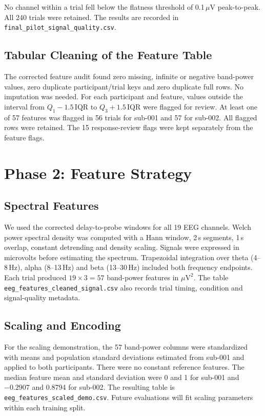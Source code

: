 \documentclass[11pt,a4paper]{article}
\begin{document}
No channel within a trial fell below the flatness threshold of
0.1\,$\mu$V peak-to-peak. All 240 trials were retained. The results
are recorded in \texttt{final\_pilot\_signal\_quality.csv}.

\subsection{Tabular Cleaning of the Feature Table}
The corrected feature audit found zero missing, infinite or negative band-power
values, zero duplicate participant/trial keys and zero duplicate full rows.
No imputation was needed. For each participant and feature, values outside
the interval from $Q_1-1.5\,\mathrm{IQR}$ to $Q_3+1.5\,\mathrm{IQR}$ were flagged
for review. At least one of 57 features was flagged in 56 trials for sub-001
and 57 for sub-002. All flagged rows were retained. The 15 response-review
flags were kept separately from the feature flags.

\section{Phase 2: Feature Strategy}

\subsection{Spectral Features}
We used the corrected delay-to-probe windows for all 19 EEG channels.
Welch power spectral density \cite{welch1967} was computed with a Hann window,
2\,s segments, 1\,s overlap, constant detrending and density scaling. Signals
were expressed in microvolts before estimating the spectrum. Trapezoidal
integration over theta (4--8\,Hz), alpha (8--13\,Hz) and beta (13--30\,Hz)
included both frequency endpoints. Each trial produced $19\times3=57$
band-power features in $\mu\mathrm{V}^2$. The table
\texttt{eeg\_features\_cleaned\_signal.csv} also records trial timing, condition
and signal-quality metadata.

\subsection{Scaling and Encoding}
For the scaling demonstration, the 57 band-power columns were standardized
with means and population standard deviations estimated from sub-001 and
applied to both participants. There were no constant reference features.
The median feature mean and standard deviation were 0 and 1 for sub-001
and $-0.2907$ and 0.8794 for sub-002. The resulting table is
\texttt{eeg\_features\_scaled\_demo.csv}. Future evaluations will fit scaling
parameters within each training split.
\end{document}
